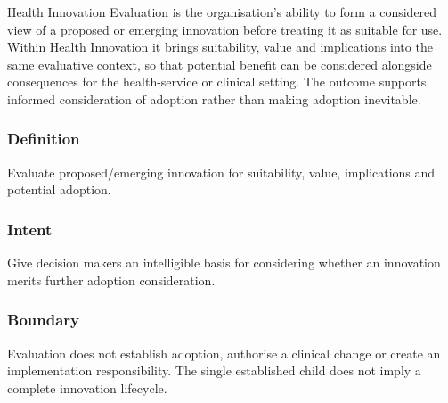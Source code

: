 Health Innovation Evaluation is the organisation's ability to form a considered view of a proposed or emerging innovation before treating it as suitable for use. Within Health Innovation it brings suitability, value and implications into the same evaluative context, so that potential benefit can be considered alongside consequences for the health-service or clinical setting. The outcome supports informed consideration of adoption rather than making adoption inevitable.

\subsubsection*{Definition}

Evaluate proposed/\allowbreak{}emerging innovation for suitability, value, implications and potential adoption.

\subsubsection*{Intent}

Give decision makers an intelligible basis for considering whether an innovation merits further adoption consideration.

\subsubsection*{Boundary}

Evaluation does not establish adoption, authorise a clinical change or create an implementation responsibility. The single established child does not imply a complete innovation lifecycle.

